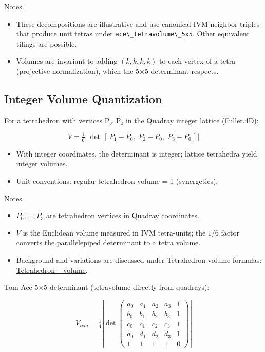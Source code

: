 \documentclass[
  10pt,
]{article}
\newcommand{\passthrough}[1]{#1}
\providecommand{\tightlist}{%
  \setlength{\itemsep}{0pt}\setlength{\parskip}{0pt}}
\begin{document}
Notes.

\begin{itemize}
\tightlist
\item
  These decompositions are illustrative and use canonical IVM neighbor
  triples that produce unit tetras under
  \passthrough{\lstinline!ace\_tetravolume\_5x5!}. Other equivalent
  tilings are possible.
\item
  Volumes are invariant to adding \((k,k,k,k)\) to each vertex of a
  tetra (projective normalization), which the 5×5 determinant respects.
\end{itemize}

\hypertarget{sec:integer_volume}{%
\subsection{Integer Volume Quantization}\label{sec:integer_volume}}

For a tetrahedron with vertices P₀..P₃ in the Quadray integer lattice
(Fuller.4D):

\begin{equation}\label{eq:lattice_det}
V = \tfrac{1}{6}\,\left|\det\,[\,P_1 - P_0,\; P_2 - P_0,\; P_3 - P_0\,]\right|
\end{equation}

\begin{itemize}
\tightlist
\item
  With integer coordinates, the determinant is integer; lattice
  tetrahedra yield integer volumes.
\item
  Unit conventions: regular tetrahedron volume = 1 (synergetics).
\end{itemize}

Notes.

\begin{itemize}
\tightlist
\item
  \(P_0,\ldots,P_3\) are tetrahedron vertices in Quadray coordinates.
\item
  \(V\) is the Euclidean volume measured in IVM tetra-units; the \(1/6\)
  factor converts the parallelepiped determinant to a tetra volume.
\item
  Background and variations are discussed under Tetrahedron volume
  formulas:
  \href{https://en.wikipedia.org/wiki/Tetrahedron\#Volume}{Tetrahedron
  -- volume}.
\end{itemize}

Tom Ace 5×5 determinant (tetravolume directly from quadrays):

\begin{equation}\label{eq:ace5x5}
V_{ivm} = \tfrac{1}{4} \left| \det \begin{pmatrix}
 a_0 & a_1 & a_2 & a_3 & 1 \\
 b_0 & b_1 & b_2 & b_3 & 1 \\
 c_0 & c_1 & c_2 & c_3 & 1 \\
 d_0 & d_1 & d_2 & d_3 & 1 \\
 1 & 1 & 1 & 1 & 0
\end{pmatrix} \right|
\end{equation}
\end{document}
